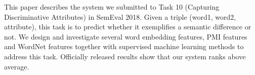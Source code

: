 This paper describes the system we submitted to Task 10 (Capturing Discriminative Attributes) in SemEval 2018. Given a triple (word1, word2, attribute), this task is to predict whether it exemplifies a semantic difference or not. We design and investigate several word embedding features, PMI features and WordNet features together with supervised machine learning methods to address this task. Officially released results show that our system ranks above average.

